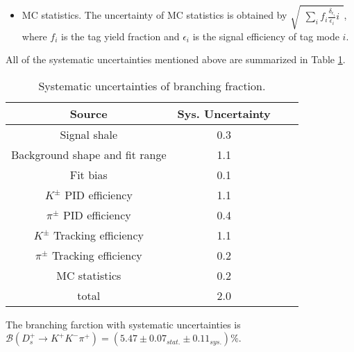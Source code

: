 {\begin{itemize}
    \item MC statistics. The uncertainty of MC statistics is obtained by $\sqrt{ \begin{matrix} \sum_{i} f_{i}\frac{\delta_{\epsilon_{i}}}{\epsilon_{i}}i\end{matrix}}$, where $f_{i}$ is the tag yield fraction and $\epsilon_{i}$ is the signal efficiency of tag mode $i$.
    \end{itemize}

    All of the systematic uncertainties mentioned above are summarized in Table \ref{BF-Sys}.
    \begin{table}
        \caption{Systematic uncertainties of branching fraction.}
        \label{BF-Sys}
        \begin{center}
            \begin{tabular}{cccc}
                \toprule\toprule
                Source   & Sys. Uncertainty\\
                \hline
                Signal shale                        & 0.3 \\
                Background shape and fit range      & 1.1 \\
                Fit bias                            & 0.1 \\
                $K^{\pm}$ PID efficiency            & 1.1 \\
                $\pi^{\pm}$ PID efficiency          & 0.4 \\
                $K^{\pm}$ Tracking efficiency       & 1.1 \\
                $\pi^{\pm}$ Tracking efficiency     & 0.2 \\
                MC statistics                       & 0.2 \\
                \hline
                total                               & 2.0 \\
                \bottomrule\bottomrule
            \end{tabular}
        \end{center}
    \end{table}

    The branching farction with systematic uncertainties is $\mathcal{B}(D_{s}^{+} \rightarrow K^{+}K^{-}\pi^{+})=(5.47\pm0.07_{stat.}\pm0.11_{sys.})\%$.




}
